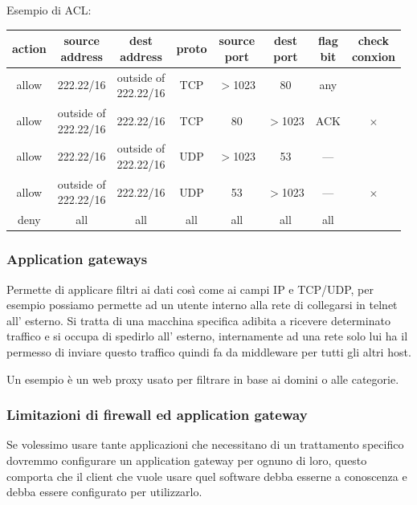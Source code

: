 Esempio di ACL:
\begin{table}[ht!]
    \centering
    \begin{tabular}{c|c|c|c|c|c|c|c}
        action & \thead{source \\ address} & \thead{dest \\ address} & proto & \thead{source \\ port} & \thead{dest \\ port} & \thead{flag \\ bit} & \thead{check \\ conxion} \\
        \hline
        allow & 222.22/16 & \thead{outside of \\ 222.22/16} & TCP & $>$1023 & 80 & any & \\
        allow & \thead{outside of \\ 222.22/16} & 222.22/16 & TCP & 80 & $>$1023 & ACK & $\times$ \\
        allow & 222.22/16 & \thead{outside of \\ 222.22/16} & UDP & $>$1023 & 53 & --- & \\
        allow & \thead{outside of \\ 222.22/16} & 222.22/16 & UDP & 53 & $>$1023 & --- & $\times$ \\ 
        deny & all & all & all & all & all & all & \\ 
    \end{tabular}
\end{table}

\subsubsection{Application gateways}
Permette di applicare filtri ai dati così come ai campi IP e TCP/UDP, per esempio possiamo permette ad un utente interno alla rete di collegarsi in telnet all' esterno.
Si tratta di una macchina specifica adibita a ricevere determinato traffico e si occupa di spedirlo all' esterno, internamente ad una rete solo lui ha il permesso di inviare questo traffico quindi fa da middleware per tutti gli altri host.

Un esempio è un web proxy usato per filtrare in base ai domini o alle categorie.

\subsubsection{Limitazioni di firewall ed application gateway}
Se volessimo usare tante applicazioni che necessitano di un trattamento specifico dovremmo configurare un application gateway per ognuno di loro, questo comporta che il client che vuole usare quel software debba esserne a conoscenza e debba essere configurato per utilizzarlo.


